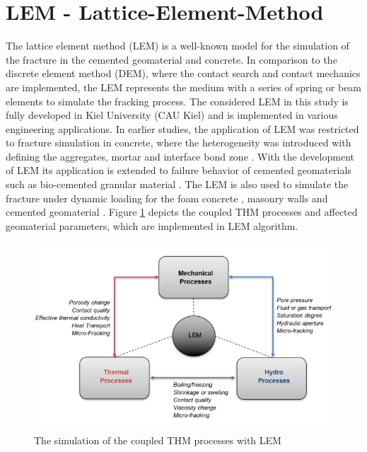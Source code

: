\section{LEM - Lattice-Element-Method}
The lattice element method (LEM) is a well-known model for the simulation of the fracture in the cemented geomaterial and concrete. In comparison to the discrete element method (DEM), where the contact search and contact mechanics are implemented, the LEM represents the medium with a series of spring or beam elements to simulate the fracking process. The considered LEM in this study is fully developed in Kiel University (CAU Kiel) and is implemented in various engineering applications. In earlier studies, the application of LEM was restricted to fracture simulation in concrete, where the heterogeneity was introduced with defining the aggregates, mortar and interface bond zone \cite{Liuetal2007, Pradoetal2003, Vanmieretal2002}. With the development of LEM its application is extended to failure behavior of cemented geomaterials such as bio-cemented granular material \cite{Rizvietal2019a}. The LEM is also used to simulate the fracture under dynamic loading for the foam concrete \cite{Rizvietal2018a}, masonry walls \cite{Sattarietal2019a} and cemented geomaterial \cite{ Rizvietal2018c, Rizvietal2020a}. Figure \ref{fig:Amir_LEM_Code} depicts the coupled THM processes and affected geomaterial parameters, which are implemented in LEM algorithm.

\begin{figure}[!ht]
\centering
\includegraphics[width=12cm,height=7cm]{figures/Amir_LEM_Code.png}
\caption{The simulation of the coupled THM processes with LEM}
\label{fig:Amir_LEM_Code}
\end{figure} 

